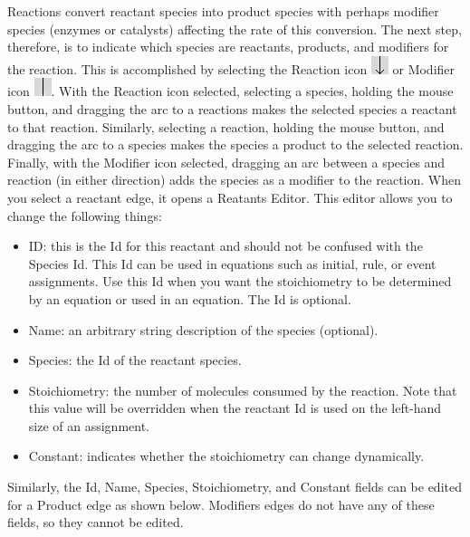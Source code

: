 \documentclass[titlepage,11pt]{article}
\begin{document}
Reactions convert reactant species into product species with perhaps modifier species (enzymes or catalysts) affecting the rate of this conversion.  The next step, therefore, is to indicate which species are reactants, products, and modifiers for the reaction.  This is accomplished by selecting the Reaction icon \includegraphics{../gui/icons/modelview/reaction_selected} or Modifier icon \includegraphics{../gui/icons/modelview/modifier_selected}.  With the Reaction icon selected, selecting a species, holding the mouse button, and dragging the arc to a reactions makes the selected species a reactant to that reaction.  Similarly, selecting a reaction, holding the mouse button, and dragging the arc to a species makes the species a product to the selected reaction.  Finally, with the Modifier icon selected, dragging an arc between a species and reaction (in either direction) adds the species as a modifier to the reaction.  When you select a reactant edge, it opens a Reatants Editor.  This editor allows you to change the following things:
\begin{itemize}
\item ID: this is the Id for this reactant and should not be confused with the Species Id.  This Id can be used in equations such as initial, rule, or event assignments.  Use this Id when you want the stoichiometry to be determined by an equation or used in an equation.  The Id is optional.
\item Name: an arbitrary string description of the species (optional).
\item Species: the Id of the reactant species.
\item Stoichiometry: the number of molecules consumed by the reaction.  Note that this value will be overridden when the reactant Id is used on the left-hand size of an assignment.
\item Constant: indicates whether the stoichiometry can change dynamically.  
\end{itemize}
Similarly, the Id, Name, Species, Stoichiometry, and Constant fields can be edited for a Product edge as shown below.  Modifiers edges do not have any of these fields, so they cannot be edited.
\end{document}
